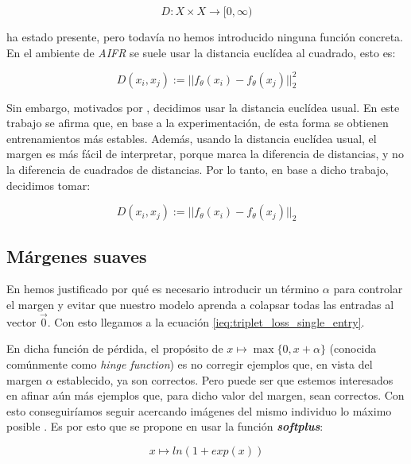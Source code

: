\begin{equation}
    D: X \times X \to [0, \infty)
\end{equation}

ha estado presente, pero todavía no hemos introducido ninguna función concreta. En el ambiente de \textit{AIFR} se suele usar la distancia euclídea al cuadrado, esto es:

\begin{equation}
    D(x_i, x_j) := ||f_{\theta}(x_i) - f_{\theta}(x_j)||^2_2
\end{equation}

Sin embargo, motivados por \cite{informatica:principal}, decidimos usar la distancia euclídea usual. En este trabajo se afirma que, en base a la experimentación, de esta forma se obtienen entrenamientos más estables. Además, usando la distancia euclídea usual, el margen es más fácil de interpretar, porque marca la diferencia de distancias, y no la diferencia de cuadrados de distancias. Por lo tanto, en base a dicho trabajo, decidimos tomar:

\begin{equation}
        D(x_i, x_j) := ||f_{\theta}(x_i) - f_{\theta}(x_j)||_2
\end{equation}

\subsection{Márgenes suaves} \label{isec:margenes_suaves}

En  hemos justificado por qué es necesario introducir un término $\alpha$ para controlar el margen y evitar que nuestro modelo aprenda a colapsar todas las entradas al vector $\vec{0}$. Con esto llegamos a la ecuación \eqref{ieq:triplet_loss_single_entry}.

En dicha función de pérdida, el propósito de $x \mapsto \max\{0, x + \alpha\}$ (conocida comúnmente como \textit{hinge function}) es no corregir ejemplos que, en vista del margen $\alpha$ establecido, ya son correctos. Pero puede ser que estemos interesados en afinar aún más ejemplos que, para dicho valor del margen, sean correctos. Con esto conseguiríamos seguir acercando imágenes del mismo individuo lo máximo posible \cite{informatica:principal}. Es por esto que se propone en usar la función \textbf{\textit{softplus}}:

\begin{equation}
    x \mapsto ln(1 + exp(x))
\end{equation}

